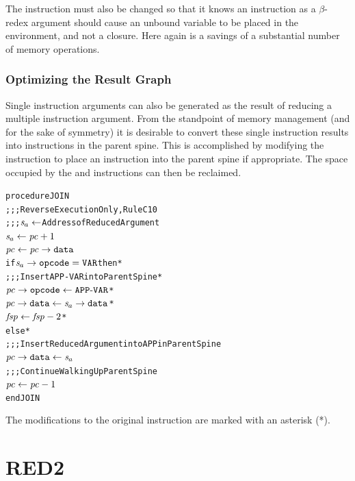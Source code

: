 The  instruction must also be changed so that it knows an
 instruction as a \(\beta\)-redex argument should cause an unbound
variable to be placed in the environment, and not a closure. Here again is a
savings of a substantial number of memory operations.

\subsubsection*{Optimizing the Result Graph}

Single  instruction arguments can also be generated as the result of
reducing a multiple instruction argument. From the standpoint of memory management
(and for the sake of symmetry) it is desirable to convert these single 
instruction results into  instructions in the parent spine. This is
accomplished by modifying the  instruction to place an 
instruction into the parent spine if appropriate. The space occupied by the
 and  instructions can then be reclaimed.


\par\smallskip\noindent\begin{minipage}{\linewidth}
\begin{alltt}
procedure JOIN
  \textrm{;;; Reverse Execution Only, Rule C10}
  \textrm{;;; \(\rtsa \leftarrow\) Address of Reduced Argument}
  \(\rtsa \leftarrow \rt{pc}+1\)
  \(\rt{pc} \leftarrow \rtfield{pc}{data}\)
  if \(\rtsa\rightarrow\mathtt{opcode} = \mathtt{VAR}\) then *
    \textrm{;;; Insert APP-VAR into Parent Spine *}
    \(\rtfield{pc}{opcode} \leftarrow \mathtt{APP}\textrm{-}\mathtt{VAR}\) *
    \(\rtfield{pc}{data} \leftarrow \rtsa\rightarrow\mathtt{data}\) *
    \(\rt{fsp} \leftarrow \rt{fsp}-2\) *
  else *
    \textrm{;;; Insert Reduced Argument into APP in Parent Spine}
    \(\rtfield{pc}{data} \leftarrow \rtsa\)
  \textrm{;;; Continue Walking Up Parent Spine}
  \(\rt{pc} \leftarrow \rt{pc}-1\)
end JOIN
\end{alltt}
\end{minipage}\par\smallskip


The modifications to the original  instruction are marked with an
asterisk (*).

\section{RED2}

